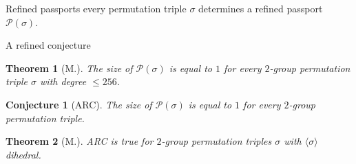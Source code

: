\documentclass[xcolor=dvipsnames]{beamer}
\theoremstyle{plain}
\newtheorem*{thm}{Theorem}
\newtheorem*{conj}{Conjecture}
\begin{document}
{\begin{frame}{Refined passports}
      every permutation triple $\sigma$
      determines a refined passport
      $\mathscr{P}(\sigma)$.
    \end{frame}
    \begin{frame}{A refined conjecture}
      \begin{thm}[M.]
        \vspace{1pt}
        The size of $\mathscr{P}(\sigma)$ is
        equal to $1$ for every
        $2$-group permutation triple
        $\sigma$ with degree $\leq 256$.
      \end{thm}
      \pause\par
      \begin{conj}[ARC]
        \vspace{1pt}
        The size of $\mathscr{P}(\sigma)$ is
        equal to $1$ for every
        $2$-group permutation triple.
      \end{conj}
      \pause\par
      \begin{thm}[M.]
        \vspace{1pt}
        ARC is true for $2$-group permutation triples $\sigma$
        with $\langle\sigma\rangle$ dihedral.
      \end{thm}
    \end{frame}
  }
\end{document}
